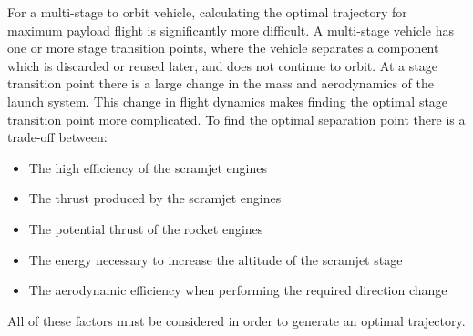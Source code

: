 For a multi-stage to orbit vehicle, calculating the optimal trajectory for maximum payload flight is significantly more difficult. A multi-stage vehicle has one or more stage transition points, where the vehicle separates a component which is discarded or reused later, and does not continue to orbit. At a stage transition point there is a large change in the mass and aerodynamics of the launch system. 
This change in flight dynamics makes finding the optimal stage transition point more complicated. To find the optimal separation point there is a trade-off between:
\begin{itemize}
	 \item The high efficiency of the scramjet engines
	 \item The thrust produced by the scramjet engines 
	 \item The potential thrust of the rocket engines
	 \item The energy necessary to increase the altitude of the scramjet stage
	 \item The aerodynamic efficiency when performing the required direction change
\end{itemize}
All of these factors must be considered in order to generate an optimal trajectory. 


